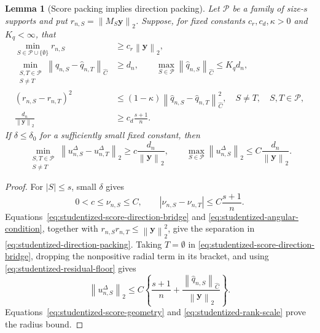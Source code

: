 \documentclass[a4paper,11pt,english]{article}
\newtheorem{lemma}[theorem]{Lemma}
\newcommand{\norm}[1]{\left\lVert #1\right\rVert}
\begin{document}
\begin{lemma}[Score packing implies direction packing]
\label{lem:score-direction-packing}
Let $\mathcal P$ be a family of size-$s$ supports and put
$r_{n,S}=\norm{M_S\mathbf y}_2$.  Suppose, for fixed constants
$c_r,c_d,\kappa>0$ and $K_q<\infty$, that
\begin{align}
 \min_{S\in\mathcal P\cup\{\emptyset\}}r_{n,S}
 &\ge c_r\norm{\mathbf y}_2,
 \label{eq:studentized-residual-floor}\\
 \min_{\substack{S,T\in\mathcal P\\S\ne T}}
 \norm{\hat q_{n,S}-\hat q_{n,T}}_{\hat C}
 &\ge d_n,
 \qquad
 \max_{S\in\mathcal P}\norm{\hat q_{n,S}}_{\hat C}
 \le K_qd_n,
 \label{eq:studentized-score-geometry}\\
 (r_{n,S}-r_{n,T})^2
 &\le(1-\kappa)
 \norm{\hat q_{n,S}-\hat q_{n,T}}_{\hat C}^2,
 \quad S\ne T,\quad S,T\in\mathcal P,
 \label{eq:studentized-angular-condition}\\
 \frac{d_n}{\norm{\mathbf y}_2}
 &\ge c_d\frac{s+1}{n}.
 \label{eq:studentized-rank-scale}
\end{align}
If $\delta\le\delta_0$ for a sufficiently small fixed constant, then
\begin{equation}\label{eq:studentized-direction-packing}
 \min_{\substack{S,T\in\mathcal P\\S\ne T}}
 \norm{u_{n,S}^{\Delta}-u_{n,T}^{\Delta}}_2
 \ge c\frac{d_n}{\norm{\mathbf y}_2},
 \qquad
 \max_{S\in\mathcal P}\norm{u_{n,S}^{\Delta}}_2
 \le C\frac{d_n}{\norm{\mathbf y}_2}.
\end{equation}
\end{lemma}

\begin{proof}
For $|S|\le s$, small $\delta$ gives
\[
 0<c\le\nu_{n,S}\le C,
 \qquad
 |\nu_{n,S}-\nu_{n,T}|\le C\frac{s+1}{n}.
\]
Equations~\eqref{eq:studentized-score-direction-bridge} and
\eqref{eq:studentized-angular-condition}, together with
$r_{n,S}r_{n,T}\le\norm{\mathbf y}_2^2$, give the separation in
\eqref{eq:studentized-direction-packing}.  Taking $T=\emptyset$ in
\eqref{eq:studentized-score-direction-bridge}, dropping the nonpositive
radial term in its bracket, and using
\eqref{eq:studentized-residual-floor} gives
\[
 \norm{u_{n,S}^{\Delta}}_2
 \le C\left\{\frac{s+1}{n}
 +\frac{\norm{\hat q_{n,S}}_{\hat C}}{\norm{\mathbf y}_2}\right\}.
\]
Equations~\eqref{eq:studentized-score-geometry} and
\eqref{eq:studentized-rank-scale} prove the radius bound.
\end{proof}
\end{document}
